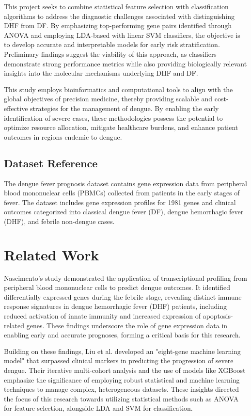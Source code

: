 \documentclass[final]{article}
\begin{document}
This project seeks to combine statistical feature selection with classification algorithms to address the diagnostic challenges associated with distinguishing DHF from DF. By emphasizing top-performing gene pairs identified through ANOVA and employing LDA-based with linear SVM classifiers, the objective is to develop accurate and interpretable models for early risk stratification. Preliminary findings suggest the viability of this approach, as classifiers demonstrate strong performance metrics while also providing biologically relevant insights into the molecular mechanisms underlying DHF and DF.

This study employs bioinformatics and computational tools to align with the global objectives of precision medicine, thereby providing scalable and cost-effective strategies for the management of dengue. By enabling the early identification of severe cases, these methodologies possess the potential to optimize resource allocation, mitigate healthcare burdens, and enhance patient outcomes in regions endemic to dengue.

\subsection*{Dataset Reference}
The dengue fever prognosis dataset contains gene expression data from peripheral blood mononuclear cells (PBMCs) collected from patients in the early stages of fever. The dataset includes gene expression profiles for 1981 genes and clinical outcomes categorized into classical dengue fever (DF), dengue hemorrhagic fever (DHF), and febrile non-dengue cases. \cite{Nascimento2009}

\section*{Related Work}
Nascimento's study demonstrated the application of transcriptional profiling from peripheral blood mononuclear cells to predict dengue outcomes. \cite{Nascimento2009} It identified differentially expressed genes during the febrile stage, revealing distinct immune response signatures in dengue hemorrhagic fever (DHF) patients, including reduced activation of innate immunity and increased expression of apoptosis-related genes. These findings underscore the role of gene expression data in enabling early and accurate prognoses, forming a critical basis for this research.

Building on these findings, Liu et al. developed an "eight-gene machine learning model" \cite{Liu2022} that surpassed clinical markers in predicting the progression of severe dengue. Their iterative multi-cohort analysis and the use of models like XGBoost emphasize the significance of employing robust statistical and machine learning techniques to manage complex, heterogeneous datasets. These insights directed the focus of this research towards utilizing statistical methods such as ANOVA for feature selection, alongside LDA and SVM for classification.
\end{document}
